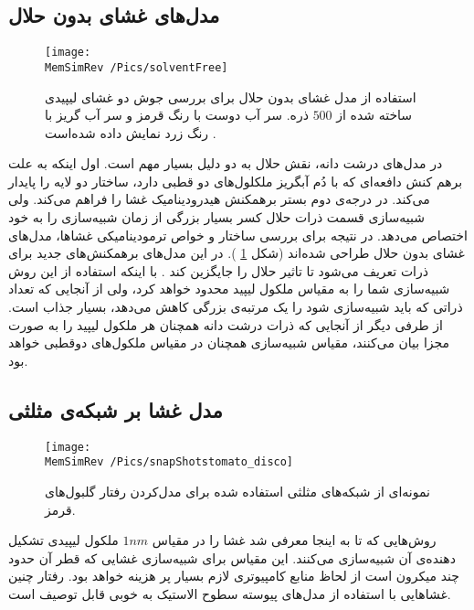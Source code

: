 \subsection{
 مدل‌های غشای بدون حلال
 }
 \begin{figure}[h]
\begin{center}
\texttt{[image: \\MemSimRev /Pics/solventFree]}
\caption{
استفاده از مدل‌ غشای بدون حلال برای بررسی جوش دو غشای لیپیدی ساخته شده از
$500$
ذره. سر آب دوست با رنگ قرمز و سر آب گریز با رنگ زرد نمایش داده شده‌است 
\cite{Noguchi2001}.
}
\label{fig:solventFree}
\end{center}
\end{figure}

 در مدل‌های درشت دانه، نقش حلال به دو دلیل بسیار مهم است. اول اینکه به علت برهم کنش دافعه‌ای که با دُم آبگریز ملکلول‌های دو قطبی دارد، ساختار دو لایه را پایدار می‌کند. در درجه‌ی دوم بستر برهمکنش هیدرودینامیک غشا را فراهم می‌کند. ولی شبیه‌سازی قسمت ذرات حلال کسر بسیار بزرگی از زمان شبیه‌سازی را به خود اختصاص می‌دهد. در نتیجه برای بررسی ساختار و خواص ترمودینامیکی غشاها، مدل‌های غشای بدون حلال
 طراحی شده‌اند (شکل
 \ref{fig:solventFree}
 ). در این مدل‌های برهمکنش‌های جدید برای ذرات تعریف می‌شود تا تاثیر حلال را جایگزین کند
 \cite{Noguchi2001, Noguchi2001PRE, Brannigan2003, Cooke2005}
 . با اینکه استفاده از این روش شبیه‌سازی شما را به مقیاس ملکول لیپید محدود خواهد کرد، ولی از آنجایی که تعداد ذراتی که باید شبیه‌سازی شود را یک مرتبه‌ی بزرگی کاهش می‌دهد، بسیار جذاب است. از طرفی دیگر از آنجایی که  ذرات درشت دانه همچنان هر ملکول لیپید را به صورت مجزا بیان می‌کنند، مقیاس شبیه‌سازی همچنان در مقیاس ملکول‌های دوقطبی خواهد بود.

\subsection{
 مدل غشا بر شبکه‌ی مثلثی
 \label{sec:simRevMesh}
 }
  \begin{figure}[h]
\begin{center}
\texttt{[image: \\MemSimRev /Pics/snapShotstomato\_disco]}
\caption{
نمونه‌ای از شبکه‌های مثلثی استفاده شده برای مدل‌کردن رفتار گلبول‌های قرمز.
}
\label{fig:RBCmeshRep}
\end{center}
\end{figure}
 
روش‌هایی که تا به اینجا معرفی شد غشا را در مقیاس 
$1nm$
ملکول لیپیدی تشکیل دهنده‌ی آن شبیه‌سازی می‌کنند. این مقیاس برای شبیه‌سازی غشایی که قطر آن حدود چند میکرون است از لحاظ منابع کامپیوتری لازم بسیار پر هزینه خواهد بود. رفتار چنین غشا‌هایی با استفاده از مدل‌های پیوسته سطوح الاستیک به خوبی قابل توصیف است. 

